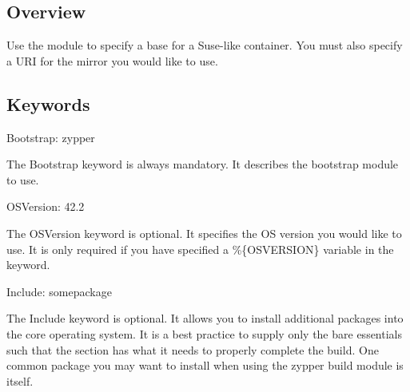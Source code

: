 \documentclass[letterpaper,10pt,english]{sphinxmanual}
\begin{document}
\subsection{Overview}
\label{\detokenize{appendix:id27}}
Use the  module to specify a base for a Suse-like container. You must also specify a URI for
the mirror you would like to use.


\subsection{Keywords}
\label{\detokenize{appendix:id28}}
%
\begin{sphinxVerbatim}[commandchars=\\\{\}]
Bootstrap: zypper
\end{sphinxVerbatim}

The Bootstrap keyword is always mandatory. It describes the bootstrap module to use.

%
\begin{sphinxVerbatim}[commandchars=\\\{\}]
OSVersion: 42.2
\end{sphinxVerbatim}

The OSVersion keyword is optional. It specifies the OS version you would like to use.
It is only required if you have specified a \%\{OSVERSION\} variable in the  keyword.

%
\begin{sphinxVerbatim}[commandchars=\\\{\}]
Include: somepackage
\end{sphinxVerbatim}

The Include keyword is optional. It allows you to install additional packages into the core operating system.
It is a best practice to supply only the bare essentials such that the  section has what it needs to properly complete the build.
One common package you may want to install when using the zypper build module is  itself.
\end{document}
